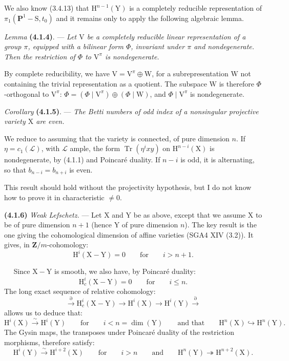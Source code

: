 \documentclass[11pt,leqno]{article}
\newcommand{\Page}[1]{\ifvmode\noindent\else\unskip\ \fi{\footnotesize\textcolor{gray}{[p.\,#1]}}\ \ignorespaces}
\begin{document}
We also know (3.4.13) that \(\mathrm{H}^{n-1}(\mathrm{Y})\) is a completely reducible representation of \(\pi_1(\mathbf{P}^1-\mathrm{S},t_0)\) and it remains only to apply the following algebraic lemma.

\textit{Lemma} \textbf{(4.1.4)}. — \textit{Let \(\mathrm{V}\) be a completely reducible linear representation of a group \(\pi\), equipped with a bilinear form \(\Phi\), invariant under \(\pi\) and nondegenerate. Then the restriction of \(\Phi\) to \(\mathrm{V}^{\pi}\) is nondegenerate.}

By complete reducibility, we have \(\mathrm{V}=\mathrm{V}^{\pi}\oplus\mathrm{W}\), for a subrepresentation \(\mathrm{W}\) not containing the trivial representation as a quotient. The subspace \(\mathrm{W}\) is therefore \(\Phi\)-orthogonal to \(\mathrm{V}^{\pi}\): \(\Phi=(\Phi\mid\mathrm{V}^{\pi})\oplus(\Phi\mid\mathrm{W})\), and \(\Phi\mid\mathrm{V}^{\pi}\) is nondegenerate.

\textit{Corollary} \textbf{(4.1.5)}. — \textit{The Betti numbers of odd index of a nonsingular projective variety \(\mathrm{X}\) are even.}

We reduce to assuming that the variety is connected, of pure dimension \(n\). If \(\eta=c_1(\mathscr{L})\), with \(\mathscr{L}\) ample, the form \(\operatorname{Tr}(\eta^ixy)\) on \(\mathrm{H}^{n-i}(\mathrm{X})\) is nondegenerate, by (4.1.1) and Poincaré duality. If \(n-i\) is odd, it is alternating, so that \(b_{n-i}=b_{n+i}\) is even.

This result should hold without the projectivity hypothesis, but I do not know how to prove it in characteristic \(\neq0\).

\textbf{(4.1.6)} \textit{Weak Lefschetz.} — Let \(\mathrm{X}\) and \(\mathrm{Y}\) be as above, except that we assume \(\mathrm{X}\) to be of pure dimension \(n+1\) (hence \(\mathrm{Y}\) of pure dimension \(n\)). The key result is the one giving the cohomological dimension of affine varieties (SGA4 XIV (3.2)). It gives, in \(\mathbf{Z}/m\)-cohomology:
\[
\mathrm{H}^i(\mathrm{X}-\mathrm{Y})=0
\qquad\text{for}\qquad i>n+1.
\]

\Page{219}
Since \(\mathrm{X}-\mathrm{Y}\) is smooth, we also have, by Poincaré duality:
\[
\mathrm{H}_c^i(\mathrm{X}-\mathrm{Y})=0
\qquad\text{for}\qquad i\leq n.
\]
The long exact sequence of relative cohomology:
\[
\xrightarrow{\partial}\mathrm{H}_c^i(\mathrm{X}-\mathrm{Y})
\to\mathrm{H}^i(\mathrm{X})
\to\mathrm{H}^i(\mathrm{Y})\xrightarrow{\partial}
\]
allows us to deduce that:
\[
\mathrm{H}^i(\mathrm{X})\xrightarrow{\sim}\mathrm{H}^i(\mathrm{Y})
\qquad\text{for}\qquad i<n=\dim(\mathrm{Y})
\qquad\text{and that}\qquad
\mathrm{H}^n(\mathrm{X})\hookrightarrow\mathrm{H}^n(\mathrm{Y}).
\]
The Gysin maps, the transposes under Poincaré duality of the restriction morphisms, therefore satisfy:
\[
\mathrm{H}^i(\mathrm{Y})\xrightarrow{\sim}\mathrm{H}^{i+2}(\mathrm{X})
\qquad\text{for}\qquad i>n
\qquad\text{and}\qquad
\mathrm{H}^n(\mathrm{Y})\twoheadrightarrow\mathrm{H}^{n+2}(\mathrm{X}).
\]
\end{document}
